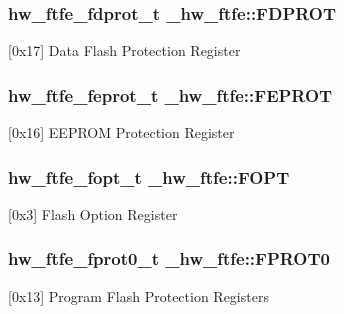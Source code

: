 \subsubsection[{\texorpdfstring{F\+D\+P\+R\+OT}{FDPROT}}]{ {\bf hw\+\_\+ftfe\+\_\+fdprot\+\_\+t} \+\_\+hw\+\_\+ftfe\+::\+F\+D\+P\+R\+OT}\hypertarget{struct__hw__ftfe_a8eefd20d25f2d46419a8396479ba64a4}{}\label{struct__hw__ftfe_a8eefd20d25f2d46419a8396479ba64a4}
\mbox{[}0x17\mbox{]} Data Flash Protection Register 
\subsubsection[{\texorpdfstring{F\+E\+P\+R\+OT}{FEPROT}}]{ {\bf hw\+\_\+ftfe\+\_\+feprot\+\_\+t} \+\_\+hw\+\_\+ftfe\+::\+F\+E\+P\+R\+OT}\hypertarget{struct__hw__ftfe_ad22796b9d2598ea1304473322e0e3d8b}{}\label{struct__hw__ftfe_ad22796b9d2598ea1304473322e0e3d8b}
\mbox{[}0x16\mbox{]} E\+E\+P\+R\+OM Protection Register 
\subsubsection[{\texorpdfstring{F\+O\+PT}{FOPT}}]{ {\bf hw\+\_\+ftfe\+\_\+fopt\+\_\+t} \+\_\+hw\+\_\+ftfe\+::\+F\+O\+PT}\hypertarget{struct__hw__ftfe_aad205e18b5155b62146a83e39d390eaa}{}\label{struct__hw__ftfe_aad205e18b5155b62146a83e39d390eaa}
\mbox{[}0x3\mbox{]} Flash Option Register 
\subsubsection[{\texorpdfstring{F\+P\+R\+O\+T0}{FPROT0}}]{ {\bf hw\+\_\+ftfe\+\_\+fprot0\+\_\+t} \+\_\+hw\+\_\+ftfe\+::\+F\+P\+R\+O\+T0}\hypertarget{struct__hw__ftfe_ad562d41672bfb48e370a644a5b564ff6}{}\label{struct__hw__ftfe_ad562d41672bfb48e370a644a5b564ff6}
\mbox{[}0x13\mbox{]} Program Flash Protection Registers 
